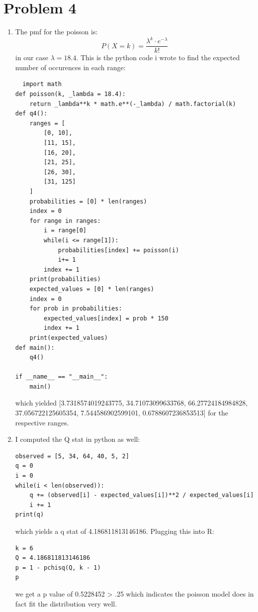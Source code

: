 \documentclass{article}
\begin{document}
\section*{Problem 4}
\begin{enumerate}
\item The pmf for the poisson is: \\
\[
P(X = k) = \frac{\lambda^k \cdot e^{-\lambda}}{k!}
\]
in our case $\lambda = 18.4$. This is the python code i wrote to find the expected number of occurences in each range: \\
\begin{verbatim}
  import math
def poisson(k, _lambda = 18.4):
    return _lambda**k * math.e**(-_lambda) / math.factorial(k) 
def q4():
    ranges = [
        [0, 10],
        [11, 15],
        [16, 20], 
        [21, 25],
        [26, 30],
        [31, 125]
    ]
    probabilities = [0] * len(ranges)
    index = 0
    for range in ranges:
        i = range[0]
        while(i <= range[1]):
            probabilities[index] += poisson(i)
            i+= 1
        index += 1
    print(probabilities)
    expected_values = [0] * len(ranges)
    index = 0
    for prob in probabilities:
        expected_values[index] = prob * 150
        index += 1
    print(expected_values)
def main():
    q4()

if __name__ == "__main__":
    main()
\end{verbatim}
which yielded [3.7318574019243775, 34.71073099633768, 66.27724184984828, 37.056722125605354, 7.544586902599101, 0.6788607236853513] for the respective ranges. 
\item I computed the Q stat in python as well: \\
\begin{verbatim}
observed = [5, 34, 64, 40, 5, 2]
q = 0
i = 0
while(i < len(observed)):
    q += (observed[i] - expected_values[i])**2 / expected_values[i]
    i += 1
print(q)
\end{verbatim}
which yields a q stat of 4.186811813146186. Plugging this into R: \\
\begin{verbatim}
k = 6
Q = 4.186811813146186
p = 1 - pchisq(Q, k - 1)
p
\end{verbatim}
we get a p value of 0.5228452 > .25 which indicates the poisson model does in fact fit the distribution very well.
\end{enumerate}
\end{document}
